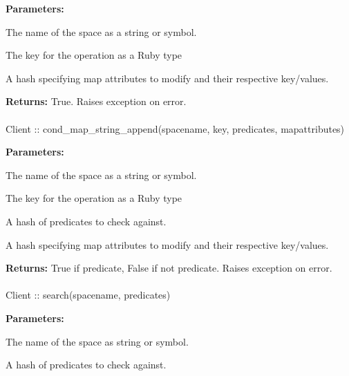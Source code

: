\noindent\textbf{Parameters:}
\begin{description}[labelindent=\widthof{{\code{mapattributes}}},leftmargin=*,noitemsep,nolistsep,align=right]
\item[\code{spacename}] The name of the space as a string or symbol.
\item[\code{key}] The key for the operation as a Ruby type
\item[\code{mapattributes}] A hash specifying map attributes to modify and their respective key/values.
\end{description}

\noindent\textbf{Returns:}
True.  Raises exception on error.

\paragraph{}
\begin{ccode}
Client :: cond_map_string_append(spacename, key, predicates, mapattributes)
\end{ccode}
\funcdesc 

\noindent\textbf{Parameters:}
\begin{description}[labelindent=\widthof{{\code{mapattributes}}},leftmargin=*,noitemsep,nolistsep,align=right]
\item[\code{spacename}] The name of the space as a string or symbol.
\item[\code{key}] The key for the operation as a Ruby type
\item[\code{predicates}] A hash of predicates to check against.
\item[\code{mapattributes}] A hash specifying map attributes to modify and their respective key/values.
\end{description}

\noindent\textbf{Returns:}
True if predicate, False if not predicate.  Raises exception on error.

\paragraph{}
\begin{ccode}
Client :: search(spacename, predicates)
\end{ccode}
\funcdesc 

\noindent\textbf{Parameters:}
\begin{description}[labelindent=\widthof{{\code{predicates}}},leftmargin=*,noitemsep,nolistsep,align=right]
\item[\code{spacename}] The name of the space as string or symbol.
\item[\code{predicates}] A hash of predicates to check against.
\end{description}

